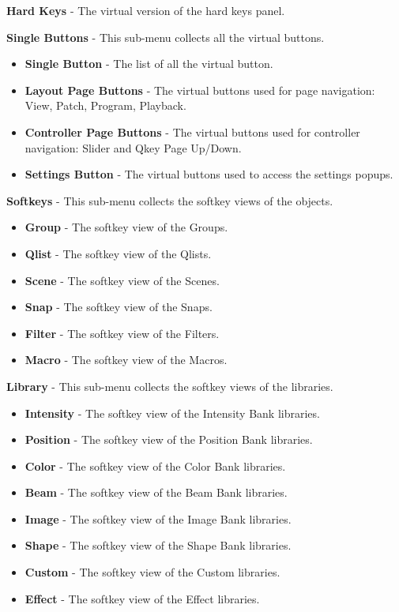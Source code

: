 \documentclass[
]{article}
\begin{document}
\textbf{Hard Keys} - The virtual version of the hard keys panel.

\textbf{Single Buttons} - This sub-menu collects all the virtual buttons.

\begin{itemize}
\item
  \textbf{Single Button} - The list of all the virtual button.
\item
  \textbf{Layout Page Buttons}
  - The virtual buttons used for page navigation: View, Patch, Program, Playback.
\item
  \textbf{Controller Page Buttons}
  - The virtual buttons used for controller navigation: Slider and Qkey Page Up/Down.
\item
  \textbf{Settings Button}
  - The virtual buttons used to access the settings popups.
\end{itemize}

\textbf{Softkeys}
- This sub-menu collects the softkey views of the objects.

\begin{itemize}
\item
  \textbf{Group}
  - The softkey view of the Groups.
\item
  \textbf{Qlist}
  - The softkey view of the Qlists.
\item
  \textbf{Scene}
  - The softkey view of the Scenes.
\item
  \textbf{Snap}
  - The softkey view of the Snaps.
\item
  \textbf{Filter}
  - The softkey view of the Filters.
\item
  \textbf{Macro}
  - The softkey view of the Macros.
\end{itemize}

\textbf{Library} - This sub-menu collects the softkey views of the libraries.

\begin{itemize}
\item
  \textbf{Intensity} - The softkey view of the Intensity Bank libraries.
\item
  \textbf{Position} - The softkey view of the Position Bank libraries.
\item
  \textbf{Color} - The softkey view of the Color Bank libraries.
\item
  \textbf{Beam} - The softkey view of the Beam Bank libraries.
\item
  \textbf{Image} - The softkey view of the Image Bank libraries.
\item
  \textbf{Shape} - The softkey view of the Shape Bank libraries.
\item
  \textbf{Custom} - The softkey view of the Custom libraries.
\item
  \textbf{Effect} - The softkey view of the Effect libraries.
\end{itemize}
\end{document}
